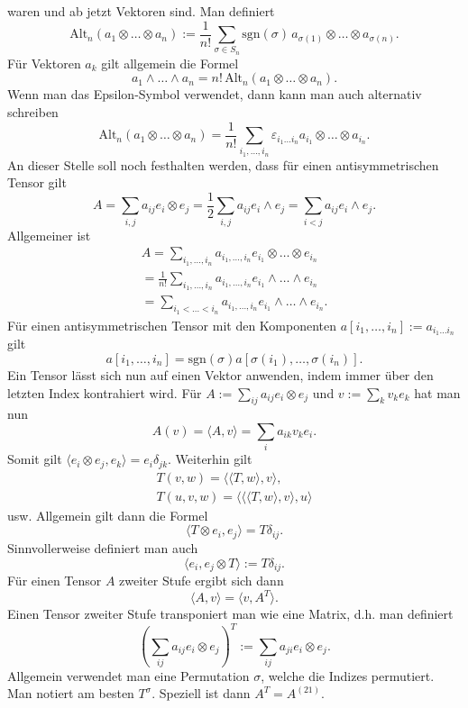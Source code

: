 \documentclass[a4paper,10pt,fleqn,twocolumn,twoside]{article}
\begin{document}
waren und ab jetzt Vektoren sind.
Man definiert
\[\mathrm{Alt}_n(a_1\otimes\ldots\otimes a_n)
:= \frac{1}{n!}\sum_{\sigma\in S_n}\mathrm{sgn}(\sigma)\,
a_{\sigma(1)}\otimes\ldots\otimes a_{\sigma(n)}.\]
Für Vektoren $a_k$ gilt allgemein die Formel
\[a_1\wedge\ldots\wedge a_n
= n!\,\mathrm{Alt}_n(a_1\otimes\ldots\otimes a_n).\]
Wenn man das Epsilon-Symbol verwendet, dann kann man auch alternativ
schreiben
\[\mathrm{Alt}_n (a_1\otimes\ldots\otimes a_n)
= \frac{1}{n!} \sum_{i_1,\ldots,i_n} \varepsilon_{i_1\ldots i_n}
a_{i_1}\otimes\ldots\otimes a_{i_n}.\]
An dieser Stelle soll noch festhalten werden,
dass für einen antisymmetrischen Tensor
gilt
\[A = \sum_{i,j}a_{ij}e_i\otimes e_j
= \frac{1}{2}\sum_{i,j}a_{ij} e_i\wedge e_j
= \sum_{i<j}a_{ij}e_i\wedge e_j.\]
Allgemeiner ist
\begin{gather*}
A = \sum_{i_1,\ldots,i_n}\!\! a_{i_1,\ldots,i_n}
e_{i_1}\!\otimes\ldots\otimes e_{i_n}\\
= \frac{1}{n!} \sum_{i_1,\ldots,i_n}\!\! a_{i_1,\ldots,i_n}
e_{i_1}\!\wedge\ldots\wedge e_{i_n}\\
= \sum_{i_1<\ldots<i_n}\!\! a_{i_1,\ldots,i_n}
e_{i_1}\!\wedge\ldots\wedge e_{i_n}.
\end{gather*}
Für einen antisymmetrischen Tensor mit den Komponenten
$a[i_1,\ldots,i_n]:=a_{i_1\ldots i_n}$ gilt
\[a[i_1,\ldots,i_n]=\mathrm{sgn}(\sigma)
a[\sigma(i_1),\ldots,\sigma(i_n)].\]
%
Ein Tensor lässt sich nun auf einen Vektor anwenden, indem immer
über den letzten Index kontrahiert wird. Für
$A:=\sum_{ij} a_{ij}e_i\otimes e_j$ und $v:=\sum_k v_ke_k$
hat man nun
\[A(v) = \langle A,v\rangle = \sum_i a_{ik}v_k e_i.\]
Somit gilt
$\langle e_i\otimes e_j, e_k\rangle = e_i\delta_{jk}$.
Weiterhin gilt
\begin{gather*}
T(v,w) = \langle\langle T,w\rangle, v\rangle,\\
T(u,v,w) = \langle\langle\langle T,w\rangle,v\rangle,u\rangle
\end{gather*}
usw. Allgemein gilt dann die Formel
\[\langle T\otimes e_i,e_j\rangle = T\delta_{ij}.\]
Sinnvollerweise definiert man auch
\[\langle e_i,e_j\otimes T\rangle := T\delta_{ij}.\]
Für einen Tensor $A$ zweiter Stufe ergibt sich dann
\[\langle A,v\rangle = \langle v,A^T\rangle.\]
Einen Tensor zweiter Stufe transponiert man wie eine Matrix, d.h. man definiert
\[(\sum_{ij}a_{ij}e_i\otimes e_j)^T:=\sum_{ij} a_{ji}e_i\otimes e_j.\]
Allgemein verwendet man eine Permutation $\sigma$, welche die
Indizes permutiert. Man notiert am besten $T^\sigma$. Speziell
ist dann $A^T=A^{(21)}$.
\end{document}
